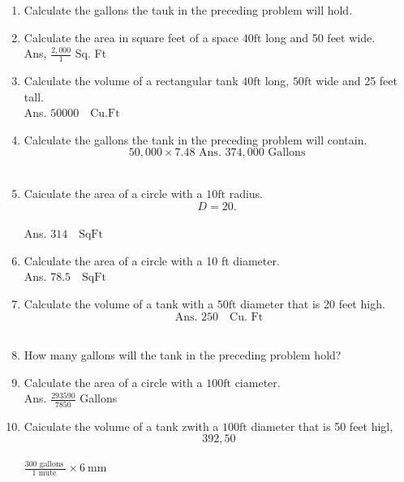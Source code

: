 \begin{enumerate}
\item Calculate the gallons the tauk in the preceding problem will hold.\\

\item Calculate the area in square feet of a space $40 \mathrm{ft}$ long and 50 feet wide.\\
Ans, $\frac{2,000}{1}$ Sq. Ft\\

\item Calculate the volume of a rectangular tank $40 \mathrm{ft}$ long, $50 \mathrm{ft}$ wide and 25 feet tall.\\
Ans. $50000 \quad \mathrm{Cu} . \mathrm{Ft}$\\

\item Calculate the gallons the tank in the preceding problem will contain.\\
$$50,000 \times 7.48 \text { Ans. } 374,000 \text { Gallons }$$\\

\item Caiculate the area of a circle with a $10 \mathrm{ft}$ radius.\\
$$D=20 \text {. }$$\\
Ans. $314 \quad \mathrm{Sq} \mathrm{Ft}$\\

\item Calculate the area of a circle with a 10 ft diameter.\\
Ans. $78.5 \quad \mathrm{Sq} \mathrm{Ft}$\\

\item Calculate the volume of a tank with a $50 \mathrm{ft}$ diameter that is 20 feet high.\\
$$\text { Ans. } 250 \quad \mathrm{Cu} \text {. Ft }$$\\

\item How many gallons will the tank in the preceding problem hold?\\

\item Calculate the area of a circle with a $100 \mathrm{ft}$ ciameter.\\
Ans. $\frac{293590}{7850}$ Gallons\\

\item Caiculate the volume of a tank zwith a $100 \mathrm{ft}$ diameter that is 50 feet higl,\\
$$392,50$$\\
$\frac{300 \text { gallons }}{1 \text { mute }} \times 6 \mathrm{~mm}$\\


\end{enumerate}
